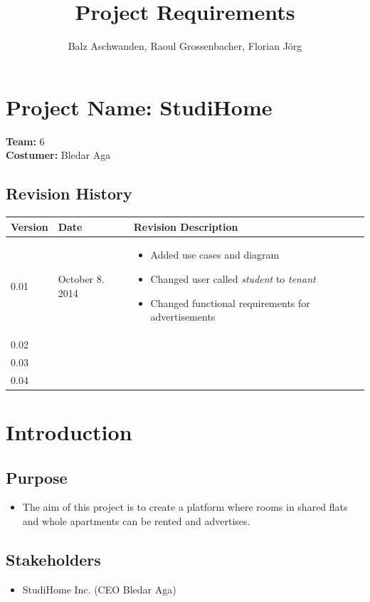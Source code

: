 \documentclass[a4paper,11pt]{article}
\title{Project Requirements}
\author{Balz Aschwanden, Raoul Grossenbacher, Florian Jörg}
\begin{document}
\maketitle
\section*{Project Name: StudiHome}

\textbf{Team:} 6 \\
\textbf{Costumer:} Bledar Aga \\

\subsection*{Revision History}
\begin{tabular}{|p{1.2cm}|p{3cm}|p{8cm}|} \hline
  Version & Date & Revision Description \\ \hline
  0.01 & October 8. 2014 &
  \begin{itemize}
  	\item Added use cases and diagram
  	\item Changed user called \textit{student} to \textit{tenant}
  	\item Changed functional requirements for advertisements
  \end{itemize} \\ \hline
  0.02 & & \\ \hline
  0.03 & & \\ \hline
  0.04 & & \\ \hline
\end{tabular}

\section{Introduction}

\subsection*{Purpose}
\begin{itemize}
  \item The aim of this project is to create a platform where rooms in shared flats and whole apartments can be rented and advertises.
\end{itemize}

\subsection*{Stakeholders}
\begin{itemize}
  \item StudiHome Inc. (CEO Bledar Aga)
\end{itemize}
\end{document}
